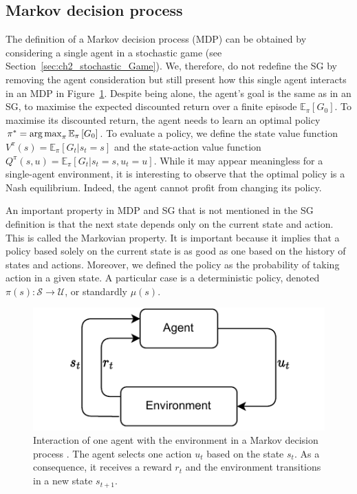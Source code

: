 \subsection{Markov decision process}
\label{sec:ch2_mdp}

The definition of a Markov decision process (MDP) can be obtained by considering a single agent in a stochastic game (see Section~\ref{sec:ch2_stochastic_Game}).
We, therefore, do not redefine the SG by removing the agent consideration but still present how this single agent interacts in an MDP in Figure~\ref{fig:ch2_mdp}.
Despite being alone, the agent's goal is the same as in an SG, to maximise the expected discounted return over a finite episode $\mathbb{E}_{\pi}\left[ G_0 \right]$.
To maximise its discounted return, the agent needs to learn an optimal policy $\pi^* = \operatorname*{arg\,max}_\pi \mathbb{E}_{\pi}\left[ G_0 \right]$.
To evaluate a policy, we define the state value function $V^\pi(s) = \mathbb{E}_{\pi}\left[G_t|s_t=s\right]$ and the state-action value function $Q^\pi(s, u) = \mathbb{E}_{\pi}\left[G_t|s_t=s, u_t=u\right]$.
While it may appear meaningless for a single-agent environment, it is interesting to observe that the optimal policy is a Nash equilibrium.
Indeed, the agent cannot profit from changing its policy.

An important property in MDP and SG that is not mentioned in the SG definition is that the next state depends only on the current state and action.
This is called the Markovian property.
It is important because it implies that a policy based solely on the current state is as good as one based on the history of states and actions.
Moreover, we defined the policy as the probability of taking action in a given state.
A particular case is a deterministic policy, denoted $\pi(s):\mathcal{S}\rightarrow\mathcal{U}$, or standardly $\mu(s)$.


\begin{figure}
    \centering
    \includegraphics[width=.8\linewidth]{tex_thesis/figures/ch2/MDP.pdf}
    \caption{Interaction of one agent with the environment in a Markov decision process \citep{sutton2018reinforcement}. The agent selects one action $u_t$ based on the state $s_t$. As a consequence, it receives a reward $r_t$ and the environment transitions in a new state $s_{t+1}$.}
    \label{fig:ch2_mdp}
\end{figure}

